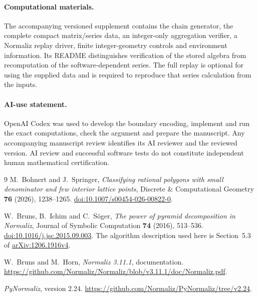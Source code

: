 \documentclass[11pt]{article}
\theoremstyle{remark}
\numberwithin{equation}{section}
\begin{document}
\paragraph{Computational materials.}
The accompanying versioned supplement contains the chain generator,
the complete compact matrix/series data, an integer-only aggregation
verifier, a Normaliz replay driver, finite integer-geometry controls and
environment information. Its README distinguishes verification of the
stored algebra from recomputation of the software-dependent series.
The full replay is optional for using the supplied data and is required
to reproduce that series calculation from the inputs.

\paragraph{AI-use statement.}
OpenAI Codex was used to develop the boundary encoding, implement and run the
exact computations, check the argument and prepare the manuscript.
Any accompanying manuscript review identifies its AI reviewer and the
reviewed version. AI review and successful software tests do not constitute
independent human mathematical certification.

\begin{thebibliography}{9}
M.~Bohnert and J.~Springer,
\emph{Classifying rational polygons with small denominator and few interior
lattice points}, Discrete \& Computational Geometry \textbf{76} (2026),
1238--1265.
\href{https://doi.org/10.1007/s00454-026-00822-0}{doi:10.1007/s00454-026-00822-0}.

W.~Bruns, B.~Ichim and C.~S\"oger,
\emph{The power of pyramid decomposition in Normaliz},
Journal of Symbolic Computation \textbf{74} (2016), 513--536.
\href{https://doi.org/10.1016/j.jsc.2015.09.003}{doi:10.1016/j.jsc.2015.09.003}.
The algorithm description used here is Section~5.3 of
\href{https://arxiv.org/abs/1206.1916v4}{arXiv:1206.1916v4}.

W.~Bruns and M.~Horn,
\emph{Normaliz 3.11.1}, documentation.
\url{https://github.com/Normaliz/Normaliz/blob/v3.11.1/doc/Normaliz.pdf}.

\emph{PyNormaliz}, version 2.24.
\url{https://github.com/Normaliz/PyNormaliz/tree/v2.24}.
\end{thebibliography}
\end{document}
